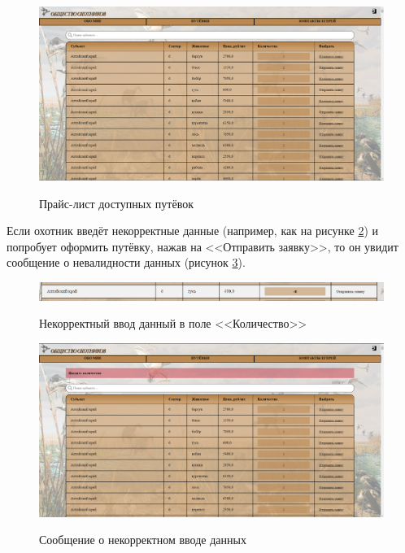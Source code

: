 	\begin{figure}[h]
		\centering
		\begin{center}
			{\includegraphics[scale=0.34]{schemes/screens/menu.png}}
			\caption{Прайс-лист доступных путёвок}
			\label{fig11:image}
		\end{center}
	\end{figure}

	Если охотник введёт некорректные данные (например, как на рисунке \ref{fig12:image}) и попробует оформить путёвку, нажав на <<Отправить заявку>>, то он увидит сообщение о невалидности данных (рисунок \ref{fig13:image}).
	
	\begin{figure}[h]
		\centering
		\begin{center}
			{\includegraphics[scale=0.34]{schemes/screens/wrong_num.png}}
			\caption{Некорректный ввод данный в поле <<Количество>>}
			\label{fig12:image}
		\end{center}
	\end{figure}

	\begin{figure}[h]
		\centering
		\begin{center}
			{\includegraphics[scale=0.34]{schemes/screens/msg_error.png}}
			\caption{Сообщение о некорректном вводе данных}
			\label{fig13:image}
		\end{center}
	\end{figure}
	\newpage
	
